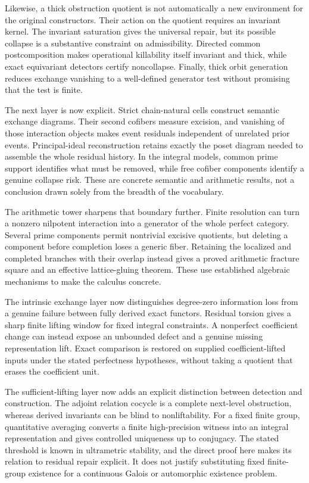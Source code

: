 \documentclass[11pt]{article}
\theoremstyle{definition}
\theoremstyle{remark}
\begin{document}
Likewise, a thick obstruction quotient is not automatically a new environment for the original constructors. Their action on the quotient requires an invariant kernel. The invariant saturation gives the universal repair, but its possible collapse is a substantive constraint on admissibility. Directed common postcomposition makes operational killability itself invariant and thick, while exact equivariant detectors certify noncollapse. Finally, thick orbit generation reduces exchange vanishing to a well-defined generator test without promising that the test is finite.

The next layer is now explicit. Strict chain-natural cells construct semantic exchange diagrams. Their second cofibers measure excision, and vanishing of those interaction objects makes event residuals independent of unrelated prior events. Principal-ideal reconstruction retains exactly the poset diagram needed to assemble the whole residual history. In the integral models, common prime support identifies what must be removed, while free cofiber components identify a genuine collapse risk. These are concrete semantic and arithmetic results, not a conclusion drawn solely from the breadth of the vocabulary.

The arithmetic tower sharpens that boundary further. Finite resolution can turn a nonzero nilpotent interaction into a generator of the whole perfect category. Several prime components permit nontrivial excisive quotients, but deleting a component before completion loses a generic fiber. Retaining the localized and completed branches with their overlap instead gives a proved arithmetic fracture square and an effective lattice-gluing theorem. These use established algebraic mechanisms to make the calculus concrete.

The intrinsic exchange layer now distinguishes degree-zero information loss from a genuine failure between fully derived exact functors. Residual torsion gives a sharp finite lifting window for fixed integral constraints. A nonperfect coefficient change can instead expose an unbounded defect and a genuine missing representation lift. Exact comparison is restored on supplied coefficient-lifted inputs under the stated perfectness hypotheses, without taking a quotient that erases the coefficient unit.

The sufficient-lifting layer now adds an explicit distinction between detection and construction. The adjoint relation cocycle is a complete next-level obstruction, whereas derived invariants can be blind to nonliftability. For a fixed finite group, quantitative averaging converts a finite high-precision witness into an integral representation and gives controlled uniqueness up to conjugacy. The stated threshold is known in ultrametric stability, and the direct proof here makes its relation to residual repair explicit. It does not justify substituting fixed finite-group existence for a continuous Galois or automorphic existence problem.
\end{document}
